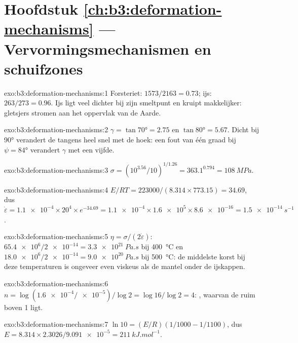 \section*{Hoofdstuk \ref{ch:b3:deformation-mechanisms} --- Vervormingsmechanismen en schuifzones}

\begin{solution}{exo:b3:deformation-mechanisms:1}
Forsteriet: $1573/2163 = 0.73$; ijs: $263/273 = 0.96$. Ijs ligt veel dichter
bij zijn smeltpunt en kruipt makkelijker: gletsjers stromen aan het oppervlak
van de Aarde.
\end{solution}

\begin{solution}{exo:b3:deformation-mechanisms:2}
$\gamma = \tan\ang{70} = 2.75$ en $\tan\ang{80} = 5.67$. Dicht bij \ang{90} verandert de
tangens heel snel met de hoek: een fout van één graad bij $\psi =
\ang{84}$ verandert $\gamma$ met een vijfde.
\end{solution}

\begin{solution}{exo:b3:deformation-mechanisms:3}
$\sigma = (10^{3.56}/10)^{1/1.26} = 363.1^{0.794} = \qty{108}{MPa}$.
\end{solution}

\begin{solution}{exo:b3:deformation-mechanisms:4}
$E/RT = 223000/(8.314\times773.15) = 34.69$, dus $\dot\varepsilon =
\num{1.1e-4}\times20^4\times e^{-34.69} = \num{1.1e-4}\times\num{1.6e5}\times
\num{8.6e-16} = \qty{1.5e-14}{s^{-1}}$.
\end{solution}

\begin{solution}{exo:b3:deformation-mechanisms:5}
$\eta = \sigma/(2\dot\varepsilon)$: $\num{65.4e6}/\num{2e-14} =
\qty{3.3e21}{Pa.s}$ bij \qty{400}{\celsius} en $\num{18.0e6}/\num{2e-14} =
\qty{9.0e20}{Pa.s}$ bij \qty{500}{\celsius}: de middelste korst bij deze
temperaturen is ongeveer even viskeus als de mantel onder de ijskappen.
\end{solution}

\begin{solution}{exo:b3:deformation-mechanisms:6}
$n = \log(\num{1.6e-4}/\num{e-5})/\log2 = \log16/\log2 = 4$: ,
waarvan de  ruim boven 1 ligt.
\end{solution}

\begin{solution}{exo:b3:deformation-mechanisms:7}
$\ln10 = (E/R)(1/1000 - 1/1100)$, dus $E = 8.314\times2.3026/\num{9.091e-5} =
\qty{211}{kJ.mol^{-1}}$.
\end{solution}

